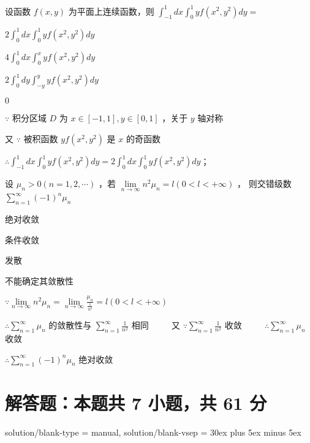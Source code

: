 \begin{question}[points = 3]
    设函数 $f(x, y)$ 为平面上连续函数，则 $\int_{-1}^{1}dx \int_{0}^{1} yf(x^2, y^2)dy = $ \, \paren[A]
\end{question}
\begin{choices}
    \item $2 \int_{0}^{1}dx \int_{0}^{1} yf(x^2, y^2)dy$
    \item $4 \int_{0}^{1}dx \int_{0}^{x} yf(x^2, y^2)dy$
    \item $2 \int_{0}^{1}dy \int_{-y}^{y} yf(x^2, y^2)dy$
    \item $0$
\end{choices}
\begin{solution}
    $\because$ 积分区域 $D$ 为 $x \in [-1 ,1], y \in [0, 1]$ ，关于 $y$ 轴对称

    又 $\because$ 被积函数 $yf(x^2, y^2)$ 是 $x$ 的奇函数

    $\therefore \int_{-1}^{1}dx \int_{0}^{1} yf(x^2, y^2)dy = 2 \int_{0}^{1}dx \int_{0}^{1} yf(x^2, y^2)dy$；
\end{solution}

\begin{question}[points = 3]
    设 $\mu_n > 0 (n = 1, 2, \cdots)$ ，若 $\lim\limits_{n \to \infty} n^2 \mu_n = l (0 < l < + \infty)$ ，
    则交错级数 $\sum\limits_{n = 1}^{\infty} (-1)^n \mu_n$ \, \paren[A]
\end{question}
\begin{choices}
    \item 绝对收敛
    \item 条件收敛
    \item 发散
    \item 不能确定其敛散性
\end{choices}
\begin{solution}
    $\because \lim\limits_{n \to \infty} n^2 \mu_n = \lim\limits_{n \to \infty} \frac{\mu_n}{\frac{1}{n^2}} = l (0 < l < + \infty)$

    $\therefore \sum\limits_{n = 1}^{\infty} \mu_n$ 的敛散性与 $\sum\limits_{n = 1}^{\infty} \frac{1}{n^2}$ 相同 $\qquad$
    又 $\because \sum\limits_{n = 1}^{\infty} \frac{1}{n^2}$ 收敛 $\qquad$
    $\therefore \sum\limits_{n = 1}^{\infty} \mu_n$ 收敛

    $\therefore \sum\limits_{n = 1}^{\infty} (-1)^n \mu_n$ 绝对收敛
\end{solution}

\section{解答题：本题共 7 小题，共 61 分}
\examsetup
{
    solution/blank-type = manual,
    solution/blank-vsep = 30ex plus 5ex minus 5ex
}


